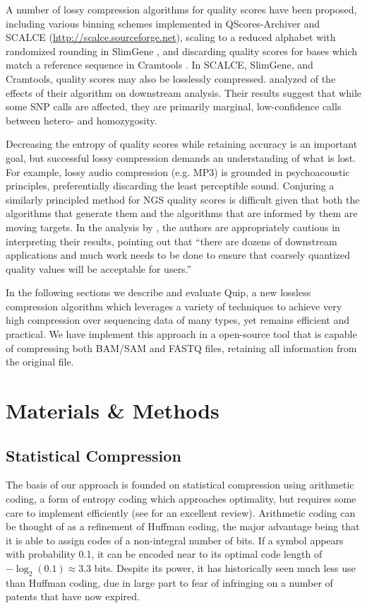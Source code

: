 \documentclass[a4,center,fleqn]{NAR}
\begin{document}
A number of lossy compression algorithms for quality scores have been
proposed, including various binning schemes implemented in QScores-Archiver
\citep{Wan2011} and SCALCE (\url{http://scalce.sourceforge.net}), scaling to a
reduced alphabet with randomized rounding in SlimGene \citep{Kozanitis2011}, and
discarding quality scores for bases which match a reference sequence
in Cramtools
\citep{Hsi-YangFritz2011}. In SCALCE, SlimGene, and Cramtools, quality scores
may also be losslessly compressed. \citet{Kozanitis2011} analyzed of the effects of their
algorithm on downstream analysis. Their results suggest that while some SNP
calls are affected, they are primarily marginal, low-confidence calls between
hetero- and homozygosity.

Decreasing the entropy of quality scores while retaining accuracy is an
important goal, but successful lossy compression demands an understanding of
what is lost. For example, lossy audio compression (e.g. MP3) is grounded in
psychoacoustic principles, preferentially discarding the least perceptible
sound. Conjuring a similarly principled method for NGS quality scores is
difficult given that both the algorithms that generate them and the algorithms
that are informed by them are moving targets. In the analysis by
\citet{Kozanitis2011}, the authors are appropriately cautious in interpreting
their results, pointing out that ``there are dozens of downstream applications
and much work needs to be done to ensure that coarsely quantized quality
values will be acceptable for users.''



In the following sections we describe and evaluate Quip, a new lossless
compression algorithm which leverages a variety of techniques to achieve very
high compression over sequencing data of many types, yet remains efficient and
practical. We have implement this approach in a open-source tool that is
capable of compressing both BAM/SAM and FASTQ files, retaining all information
from the original file.


\section{Materials \& Methods}

\subsection{Statistical Compression}

The basis of our approach is founded on statistical compression using
arithmetic coding, a form of entropy coding which approaches optimality, but
requires some care to implement efficiently (see \citet{Said2004} for an
excellent review). Arithmetic coding can be thought of as a refinement of
Huffman coding, the major advantage being that it is able to assign codes of a
non-integral number of bits. If a symbol appears with probability 0.1, it can
be encoded near to its optimal code length of $-\log_2(0.1) \approx 3.3$ bits.
Despite its power, it has historically seen much less use than Huffman coding,
due in large part to fear of infringing on a number of patents that have now
expired.
\end{document}
